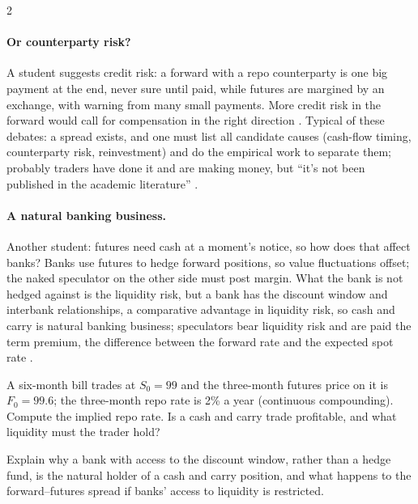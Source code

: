 \begin{paracol}{2}
\paragraph{Or counterparty risk?} A student suggests credit risk: a forward with a repo counterparty is one big payment at the end, never sure until paid, while
futures are margined by an exchange, with warning from many small payments. More credit risk in the forward would call for compensation in the right direction
. Typical of these debates: a spread exists, and one must list all candidate causes
(cash-flow timing, counterparty risk, reinvestment) and do the empirical work to separate them; probably traders have done it and are making money, but ``it's not
been published in the academic literature'' .

\paragraph{A natural banking business.} Another student: futures need cash at a moment's notice, so how does that affect banks? Banks use futures to hedge forward
positions, so value fluctuations offset; the naked speculator on the other side must post margin. What the bank is not hedged against is the liquidity risk, but a
bank has the discount window and interbank relationships, a comparative advantage in liquidity risk, so cash and carry is natural banking business; speculators bear
liquidity risk and are paid the term premium, the difference between the forward rate and the expected spot rate
.

\flushside

\begin{exercise}
A six-month bill trades at $S_0=99$ and the three-month futures price on it is $F_0=99.6$; the three-month repo rate is 2\% a year (continuous compounding). Compute the
implied repo rate. Is a cash and carry trade profitable, and what liquidity must the trader hold?
\end{exercise}

\begin{exercise}
Explain why a bank with access to the discount window, rather than a hedge fund, is the natural holder of a cash and carry position, and what happens to the
forward--futures spread if banks' access to liquidity is restricted.
\end{exercise}

\end{paracol}
